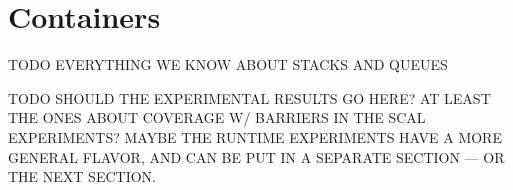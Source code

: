 \section{Containers}
\label{sec:containers}

TODO EVERYTHING WE KNOW ABOUT STACKS AND QUEUES

TODO SHOULD THE EXPERIMENTAL RESULTS GO HERE? AT LEAST THE ONES ABOUT COVERAGE
W/ BARRIERS IN THE SCAL EXPERIMENTS? MAYBE THE RUNTIME EXPERIMENTS HAVE A MORE
GENERAL FLAVOR, AND CAN BE PUT IN A SEPARATE SECTION --- OR THE NEXT SECTION.

